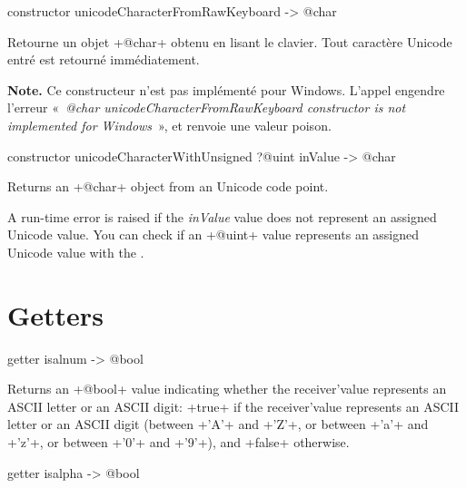 
\begin{galgas3}
constructor unicodeCharacterFromRawKeyboard -> @char
\end{galgas3}


Retourne un objet \ggst+@char+ obtenu en lisant le clavier. Tout caractère Unicode entré est retourné immédiatement.

{\bf Note.} Ce constructeur n'est pas implémenté pour Windows. L'appel engendre l'erreur «~\emph{@char unicodeCharacterFromRawKeyboard constructor is not implemented for Windows}~», et renvoie une valeur poison.







\begin{galgas3}
constructor unicodeCharacterWithUnsigned ?@uint inValue -> @char
\end{galgas3}


Returns an \ggst+@char+ object from an Unicode code point.

A run-time error is raised if the \emph{inValue} value does not represent an assigned Unicode value. You can check if an \ggst+@uint+ value represents an assigned Unicode value with the .


\section{Getters}



\begin{galgas3}
getter isalnum -> @bool
\end{galgas3}

Returns an \ggst+@bool+ value indicating whether the receiver'value represents an ASCII letter or an ASCII digit: \ggst+true+ if the receiver'value represents an ASCII letter or an ASCII digit (between \ggst+'A'+ and \ggst+'Z'+, or between \ggst+'a'+ and \ggst+'z'+, or between \ggst+'0'+ and \ggst+'9'+), and \ggst+false+ otherwise.





\begin{galgas3}
getter isalpha -> @bool
\end{galgas3}

